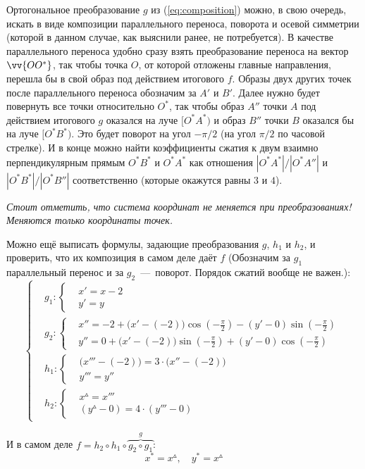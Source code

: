 \documentclass[a4paper,12pt]{article}
\begin{document}
\begin{solution}
    Ортогональное преобразование $g$ из (\ref{eq:composition}) можно, в свою очередь, искать в виде композиции параллельного переноса, поворота и осевой симметрии (которой в данном случае, как выяснили ранее, не потребуется).
    В качестве параллельного переноса удобно сразу взять преобразование переноса на вектор $\vv{OO^*}$, так чтобы точка $O$, от которой отложены главные направления, перешла бы в свой образ под действием итогового $f$.
    Образы двух других точек после параллельного переноса обозначим за $A'$ и $B'$.
    Далее нужно будет повернуть все точки относительно $O^*$, так чтобы образ $A''$ точки $A$ под действием итогового $g$ оказался на луче $[O^*A^*)$ и образ $B''$ точки $B$ оказался бы на луче $[O^*B^*)$.
    Это будет поворот на угол $-\pi/2$ (на угол $\pi/2$ по часовой стрелке).
    И в конце можно найти коэффициенты сжатия к двум взаимно перпендикулярным прямым $O^*B^*$ и $O^*A^*$ как отношения $|O^*A^*|/|O^*A''|$ и $|O^*B^*|/|O^*B''|$ соответственно (которые окажутся равны $3$ и $4$).
    
    \emph{Стоит отметить, что система координат не меняется при преобразованиях! Меняются только координаты точек.}
    
    Можно ещё выписать формулы, задающие преобразования $g$, $h_1$ и $h_2$, и проверить, что их композиция в самом деле даёт $f$ (Обозначим за $g_1$ параллельный перенос и за $g_2$~---~поворот. Порядок сжатий вообще не важен.):
    \[
      \left\{
        \begin{aligned}
          &g_1\colon \left\{
            \begin{aligned}
              &x' = x - 2\\
              &y' = y
            \end{aligned}
          \right.\\
          &g_2\colon \left\{
            \begin{aligned}
              &x{''} = -2 + \bigl(x' - (-2)\bigr)\cos{\left(-\frac{\pi}{2}\right)} - (y' - 0)\sin{\left(-\frac{\pi}{2}\right)}\\
              &y{''} = 0 + \bigl(x' - (-2)\bigr)\sin{\left(-\frac{\pi}{2}\right)} + (y' - 0)\cos{\left(-\frac{\pi}{2}\right)}
            \end{aligned}
          \right.\\
          &h_1\colon \left\{
            \begin{aligned}
              &\bigl(x{'''} - (-2)\bigr)= 3 \cdot \bigl(x{''} - (-2)\bigr)\\
              &y{'''} = y{''}
            \end{aligned}
          \right.\\
          &h_2\colon \left\{
            \begin{aligned}
              &x^{\vartriangle} = x{'''}\\
              &(y^{\vartriangle} - 0) = 4 \cdot (y{'''} - 0)
            \end{aligned}
          \right.
        \end{aligned}
      \right.
    \]
    
    И в самом деле $f = h_2 \circ h_1 \circ \overbrace{g_2 \circ g_1}^g$:
    \[
      x^* = x^{\vartriangle},\quad y^* = x^{\vartriangle}
    \]
  \end{solution}
  
\end{document}
